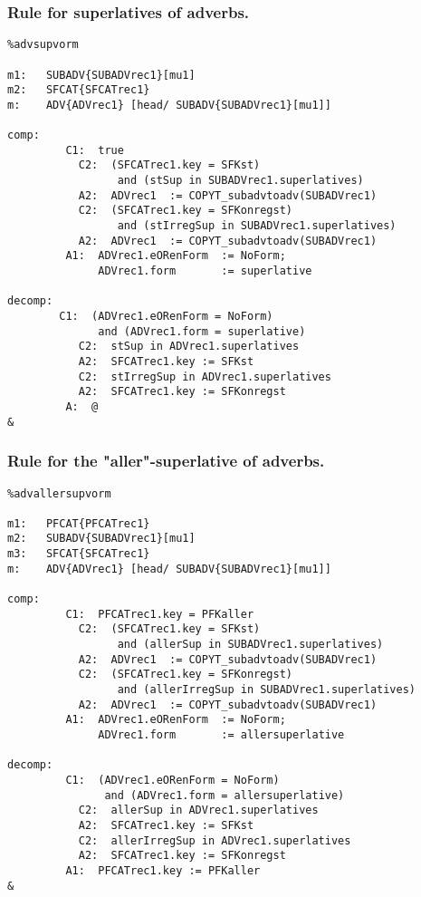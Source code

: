 \subsubsection{Rule for superlatives of adverbs.}
\begin{verbatim} 
%advsupvorm

m1:   SUBADV{SUBADVrec1}[mu1]
m2:   SFCAT{SFCATrec1}
m:    ADV{ADVrec1} [head/ SUBADV{SUBADVrec1}[mu1]]

comp:    
         C1:  true
           C2:  (SFCATrec1.key = SFKst) 
                 and (stSup in SUBADVrec1.superlatives)
           A2:  ADVrec1  := COPYT_subadvtoadv(SUBADVrec1)
           C2:  (SFCATrec1.key = SFKonregst)
                 and (stIrregSup in SUBADVrec1.superlatives)
           A2:  ADVrec1  := COPYT_subadvtoadv(SUBADVrec1)
         A1:  ADVrec1.eORenForm  := NoForm; 
              ADVrec1.form       := superlative

decomp:  
        C1:  (ADVrec1.eORenForm = NoForm)
              and (ADVrec1.form = superlative)
           C2:  stSup in ADVrec1.superlatives
           A2:  SFCATrec1.key := SFKst
           C2:  stIrregSup in ADVrec1.superlatives
           A2:  SFCATrec1.key := SFKonregst
         A:  @
&
\end{verbatim}
\newpage
\subsubsection{Rule for the "aller"-superlative of adverbs.}
\begin{verbatim} 
%advallersupvorm

m1:   PFCAT{PFCATrec1}
m2:   SUBADV{SUBADVrec1}[mu1]
m3:   SFCAT{SFCATrec1}
m:    ADV{ADVrec1} [head/ SUBADV{SUBADVrec1}[mu1]]

comp:    
         C1:  PFCATrec1.key = PFKaller
           C2:  (SFCATrec1.key = SFKst) 
                 and (allerSup in SUBADVrec1.superlatives)
           A2:  ADVrec1  := COPYT_subadvtoadv(SUBADVrec1)
           C2:  (SFCATrec1.key = SFKonregst) 
                 and (allerIrregSup in SUBADVrec1.superlatives)
           A2:  ADVrec1  := COPYT_subadvtoadv(SUBADVrec1)
         A1:  ADVrec1.eORenForm  := NoForm;
              ADVrec1.form       := allersuperlative

decomp:  
         C1:  (ADVrec1.eORenForm = NoForm) 
               and (ADVrec1.form = allersuperlative)
           C2:  allerSup in ADVrec1.superlatives
           A2:  SFCATrec1.key := SFKst
           C2:  allerIrregSup in ADVrec1.superlatives
           A2:  SFCATrec1.key := SFKonregst
         A1:  PFCATrec1.key := PFKaller
&
\end{verbatim}
\newpage
